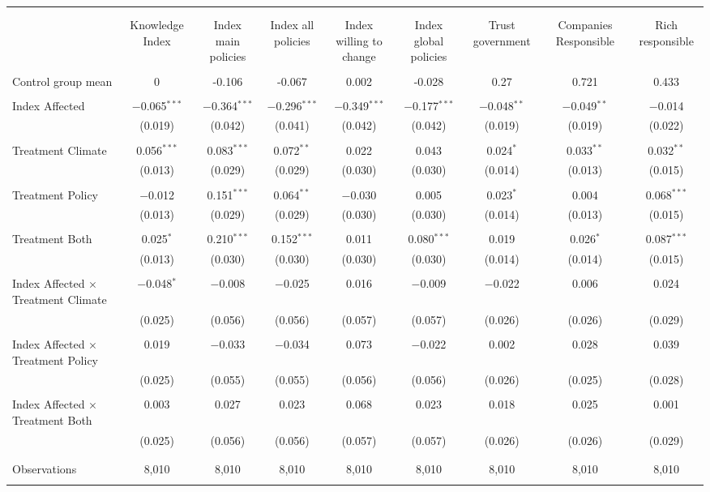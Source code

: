 
\begin{tabular}{@{\extracolsep{5pt}}lcccccccc} 
\\[-1.8ex]\hline 
\hline \\[-1.8ex] 
\\[-1.8ex] & Knowledge Index & Index main policies & Index all policies & Index willing to change & Index global policies & Trust government & Companies Responsible & Rich responsible \\ 
\hline \\[-1.8ex] 
 Control group mean & 0 & -0.106 & -0.067 & 0.002 & -0.028 & 0.27 & 0.721 & 0.433  \\ \hline \\[-1.8ex] Index Affected & $-$0.065$^{***}$ & $-$0.364$^{***}$ & $-$0.296$^{***}$ & $-$0.349$^{***}$ & $-$0.177$^{***}$ & $-$0.048$^{**}$ & $-$0.049$^{**}$ & $-$0.014 \\ 
  & (0.019) & (0.042) & (0.041) & (0.042) & (0.042) & (0.019) & (0.019) & (0.022) \\ 
  & & & & & & & & \\ 
 Treatment Climate & 0.056$^{***}$ & 0.083$^{***}$ & 0.072$^{**}$ & 0.022 & 0.043 & 0.024$^{*}$ & 0.033$^{**}$ & 0.032$^{**}$ \\ 
  & (0.013) & (0.029) & (0.029) & (0.030) & (0.030) & (0.014) & (0.013) & (0.015) \\ 
  & & & & & & & & \\ 
 Treatment Policy & $-$0.012 & 0.151$^{***}$ & 0.064$^{**}$ & $-$0.030 & 0.005 & 0.023$^{*}$ & 0.004 & 0.068$^{***}$ \\ 
  & (0.013) & (0.029) & (0.029) & (0.030) & (0.030) & (0.014) & (0.013) & (0.015) \\ 
  & & & & & & & & \\ 
 Treatment Both & 0.025$^{*}$ & 0.210$^{***}$ & 0.152$^{***}$ & 0.011 & 0.080$^{***}$ & 0.019 & 0.026$^{*}$ & 0.087$^{***}$ \\ 
  & (0.013) & (0.030) & (0.030) & (0.030) & (0.030) & (0.014) & (0.014) & (0.015) \\ 
  & & & & & & & & \\ 
 Index Affected $\times$ Treatment Climate & $-$0.048$^{*}$ & $-$0.008 & $-$0.025 & 0.016 & $-$0.009 & $-$0.022 & 0.006 & 0.024 \\ 
  & (0.025) & (0.056) & (0.056) & (0.057) & (0.057) & (0.026) & (0.026) & (0.029) \\ 
  & & & & & & & & \\ 
 Index Affected $\times$ Treatment Policy & 0.019 & $-$0.033 & $-$0.034 & 0.073 & $-$0.022 & 0.002 & 0.028 & 0.039 \\ 
  & (0.025) & (0.055) & (0.055) & (0.056) & (0.056) & (0.026) & (0.025) & (0.028) \\ 
  & & & & & & & & \\ 
 Index Affected $\times$ Treatment Both & 0.003 & 0.027 & 0.023 & 0.068 & 0.023 & 0.018 & 0.025 & 0.001 \\ 
  & (0.025) & (0.056) & (0.056) & (0.057) & (0.057) & (0.026) & (0.026) & (0.029) \\ 
  & & & & & & & & \\ 
\hline \\[-1.8ex] 

Observations & 8,010 & 8,010 & 8,010 & 8,010 & 8,010 & 8,010 & 8,010 & 8,010 \\ 
\hline 
\hline \\[-1.8ex] 
\end{tabular} 